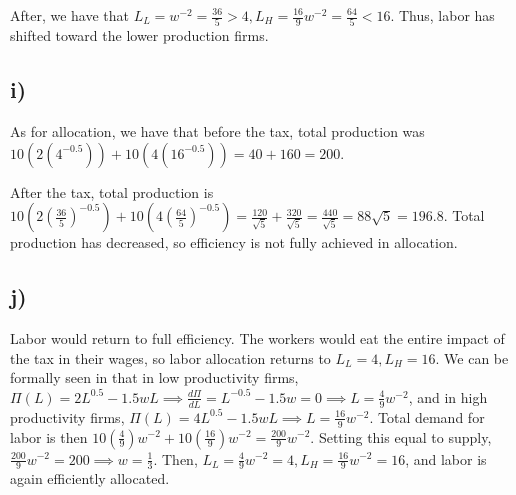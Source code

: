 \documentclass[12pt,letterpaper]{article}
\theoremstyle{definition}
\begin{document}
After, we have that $L_L = w^{-2} = \frac{36}{5} > 4, L_H = \frac{16}{9}w^{-2} =
\frac{64}{5} < 16$. Thus, labor has shifted toward the lower production firms.

\subsection*{i)}

As for allocation, we have that before the tax, total production was
$10(2(4^{-0.5})) + 10(4(16^{-0.5})) = 40 + 160 = 200$.

After the tax, total production is $10(2(\frac{36}{5})^{-0.5}) +
10(4(\frac{64}{5})^{-0.5}) = \frac{120}{\sqrt{5}} + \frac{320}{\sqrt{5}} =
\frac{440}{\sqrt{5}} = 88\sqrt{5} = 196.8$. Total production has decreased, so
efficiency is not fully achieved in allocation.

\subsection*{j)}

Labor would return to full efficiency. The workers would eat the entire impact
of the tax in their wages, so labor allocation returns to $L_L= 4, L_H = 16$. We
can be formally seen in that in low productivity firms, $\Pi(L) = 2L^{0.5} -
1.5wL \implies \frac{d\Pi}{dL} = L^{-0.5} - 1.5w = 0 \implies L =
\frac{4}{9}w^{-2}$, and in high productivity firms, $\Pi(L) = 4L^{0.5} - 1.5wL
\implies L = \frac{16}{9}w^{-2}$. Total demand for labor is then
$10(\frac{4}{9})w^{-2} + 10(\frac{16}{9})w^{-2} = \frac{200}{9}w^{-2}$. Setting
this equal to supply, $\frac{200}{9}w^{-2} = 200 \implies w = \frac{1}{3}$.
Then, $L_L = \frac{4}{9}w^{-2} = 4, L_H = \frac{16}{9}w^{-2} = 16$, and labor is
again efficiently allocated.
\end{document}

